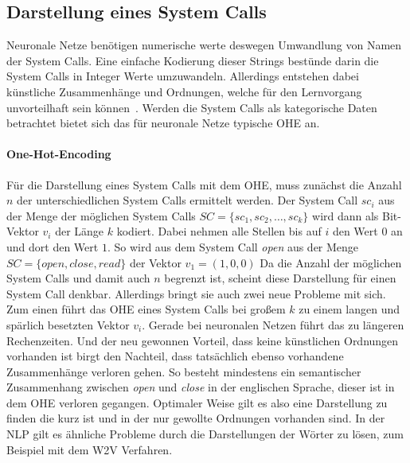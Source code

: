         \subsection{Darstellung eines System Calls}\label{sec:syscalldarstellung}
            Neuronale Netze benötigen numerische werte deswegen Umwandlung von Namen der System Calls. 
            Eine einfache Kodierung dieser Strings bestünde darin die System Calls in Integer Werte umzuwandeln.
            Allerdings entstehen dabei künstliche Zusammenhänge und Ordnungen, welche für den Lernvorgang unvorteilhaft sein können~\cite{NEURALBISHOP1995}.
            Werden die System Calls als kategorische Daten betrachtet bietet sich das für neuronale Netze typische \ac{OHE} an.
            \paragraph{One-Hot-Encoding}
                Für die Darstellung eines System Calls mit dem \ac{OHE}, muss zunächst die Anzahl $n$ der unterschiedlichen System Calls ermittelt werden.
                Der System Call $sc_i$ aus der Menge der möglichen System Calls $ SC = \{sc_1,sc_2,\dots,sc_k\}$ 
                wird dann als Bit-Vektor $v_i$ der Länge $k$ kodiert.
                Dabei nehmen alle Stellen bis auf $i$ den Wert $0$ an und dort den Wert $1$.
                So wird aus dem System Call \textit{open} aus der Menge $SC = \{open, close, read\}$ der Vektor $v_1 = (1, 0, 0)$
                Da die Anzahl der möglichen System Calls und damit auch $n$ begrenzt ist, scheint diese Darstellung für einen System Call denkbar.
                Allerdings bringt sie auch zwei neue Probleme mit sich.
                Zum einen führt das \ac{OHE} eines System Calls bei großem $k$ zu einem langen und spärlich besetzten Vektor $v_i$.
                Gerade bei neuronalen Netzen führt das zu längeren Rechenzeiten.
                Und der neu gewonnen Vorteil, dass keine künstlichen Ordnungen vorhanden ist birgt den Nachteil, dass tatsächlich ebenso vorhandene Zusammenhänge verloren gehen.
                So besteht mindestens ein semantischer Zusammenhang zwischen \textit{open} und \textit{close} in der englischen Sprache, dieser ist in dem \ac{OHE} verloren gegangen. 
                Optimaler Weise gilt es also eine Darstellung zu finden die kurz ist und in der nur gewollte Ordnungen vorhanden sind.
                In der \ac{NLP} gilt es ähnliche Probleme durch die Darstellungen der Wörter zu lösen, zum Beispiel mit dem \ac{W2V} Verfahren.

